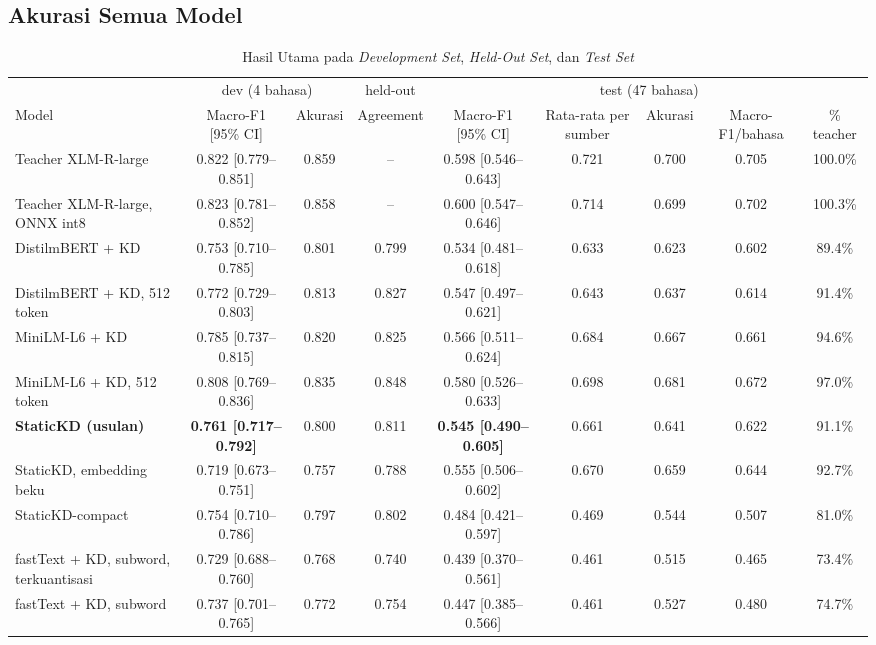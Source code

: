 \documentclass{ieeeaccess}
\newcommand{\en}[1]{\textit{#1}}
\begin{document}
\subsection{Akurasi Semua Model}
\label{sec:res-acc}
\begin{table}[!t]
\caption{Hasil Utama pada \en{Development Set}, \en{Held-Out Set}, dan \en{Test Set}}
\label{tab:main}
\centering
\scriptsize
\setlength{\tabcolsep}{3pt}
\begin{tabular}{@{}lcccccccc@{}}
\toprule
 & \multicolumn{2}{c}{dev (4 bahasa)} & held-out & \multicolumn{5}{c}{test (47 bahasa)} \\
\cmidrule(lr){2-3}\cmidrule(lr){4-4}\cmidrule(lr){5-9}
Model & Macro-F1 [95\% CI] & Akurasi & Agreement & Macro-F1 [95\% CI] & Rata-rata per sumber & Akurasi & Macro-F1/bahasa & \% teacher \\
\midrule
Teacher XLM-R-large & 0.822 [0.779--0.851] & 0.859 & -- & 0.598 [0.546--0.643] & 0.721 & 0.700 & 0.705 & 100.0\% \\
Teacher XLM-R-large, ONNX int8 & 0.823 [0.781--0.852] & 0.858 & -- & 0.600 [0.547--0.646] & 0.714 & 0.699 & 0.702 & 100.3\% \\
\midrule
DistilmBERT + KD & 0.753 [0.710--0.785] & 0.801 & 0.799 & 0.534 [0.481--0.618] & 0.633 & 0.623 & 0.602 & 89.4\% \\
DistilmBERT + KD, 512 token & 0.772 [0.729--0.803] & 0.813 & 0.827 & 0.547 [0.497--0.621] & 0.643 & 0.637 & 0.614 & 91.4\% \\
MiniLM-L6 + KD & 0.785 [0.737--0.815] & 0.820 & 0.825 & 0.566 [0.511--0.624] & 0.684 & 0.667 & 0.661 & 94.6\% \\
MiniLM-L6 + KD, 512 token & 0.808 [0.769--0.836] & 0.835 & 0.848 & 0.580 [0.526--0.633] & 0.698 & 0.681 & 0.672 & 97.0\% \\
\midrule
\textbf{StaticKD (usulan)} & \textbf{0.761 [0.717--0.792]} & 0.800 & 0.811 & \textbf{0.545 [0.490--0.605]} & 0.661 & 0.641 & 0.622 & 91.1\% \\
StaticKD, embedding beku & 0.719 [0.673--0.751] & 0.757 & 0.788 & 0.555 [0.506--0.602] & 0.670 & 0.659 & 0.644 & 92.7\% \\
StaticKD-compact & 0.754 [0.710--0.786] & 0.797 & 0.802 & 0.484 [0.421--0.597] & 0.469 & 0.544 & 0.507 & 81.0\% \\
\midrule
fastText + KD, subword, terkuantisasi & 0.729 [0.688--0.760] & 0.768 & 0.740 & 0.439 [0.370--0.561] & 0.461 & 0.515 & 0.465 & 73.4\% \\
fastText + KD, subword & 0.737 [0.701--0.765] & 0.772 & 0.754 & 0.447 [0.385--0.566] & 0.461 & 0.527 & 0.480 & 74.7\% \\

\end{tabular}
\end{table}
\end{document}
